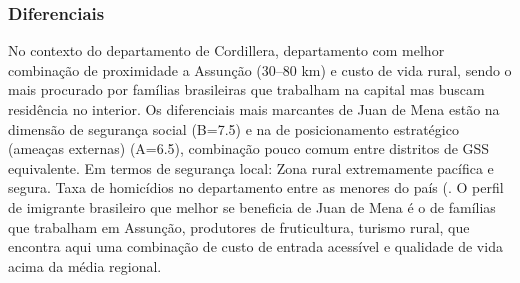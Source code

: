\subsubsection*{Diferenciais}\label{dif-juan-de-mena-0310}
No contexto do departamento de Cordillera, departamento com melhor combinação de proximidade a Assunção (30–80 km) e custo de vida rural, sendo o mais procurado por famílias brasileiras que trabalham na capital mas buscam residência no interior. Os diferenciais mais marcantes de Juan de Mena estão na dimensão de segurança social (B=7.5) e na de posicionamento estratégico (ameaças externas) (A=6.5), combinação pouco comum entre distritos de GSS equivalente. Em termos de segurança local: Zona rural extremamente pacífica e segura. Taxa de homicídios no departamento entre as menores do país (. O perfil de imigrante brasileiro que melhor se beneficia de Juan de Mena é o de famílias que trabalham em Assunção, produtores de fruticultura, turismo rural, que encontra aqui uma combinação de custo de entrada acessível e qualidade de vida acima da média regional.
